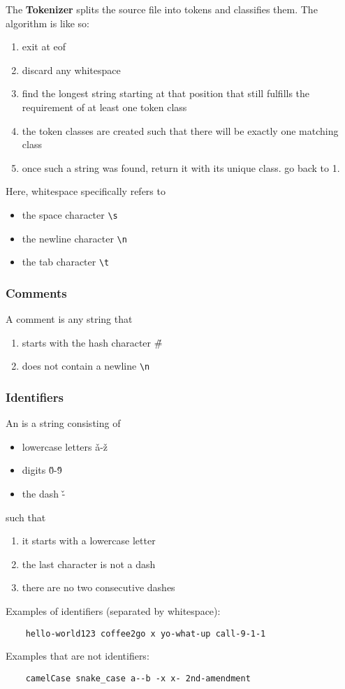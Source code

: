 \documentclass{article}
\begin{document}
The {\bf Tokenizer} splits the source file into tokens
and classifies them. The algorithm is like so:
\begin{enumerate}
    \item exit at eof
    \item discard any whitespace
    \item find the longest string starting at that position
    that still fulfills the requirement
    of at least one token class
    \item the token classes are created such that there
    will be exactly one matching class
    \item once such a string was found, return it with
    its unique class. go back to 1.
\end{enumerate}
Here, whitespace specifically refers to
\begin{itemize}
    \item the space character \verb$\s$
    \item the newline character \verb$\n$
    \item the tab character \verb$\t$
\end{itemize}

\subsubsection{Comments}
A comment is any string that
\begin{enumerate}
    \item starts with the hash character \v{\#}
    \item does not contain a newline \verb$\n$
\end{enumerate}
\subsubsection{Identifiers}
An \tident is a string consisting of
\begin{itemize}
    \item lowercase letters \v a-\v z
    \item digits \v0-\v9
    \item the dash \v-
\end{itemize}
such that
\begin{enumerate}
    \item it starts with a lowercase letter
    \item the last character is not a dash
    \item there are no two consecutive dashes
\end{enumerate}
Examples of identifiers (separated by whitespace):
\begin{verbatim}
    hello-world123 coffee2go x yo-what-up call-9-1-1
\end{verbatim}
Examples that are not identifiers:
\begin{verbatim}
    camelCase snake_case a--b -x x- 2nd-amendment
\end{verbatim}
\end{document}

